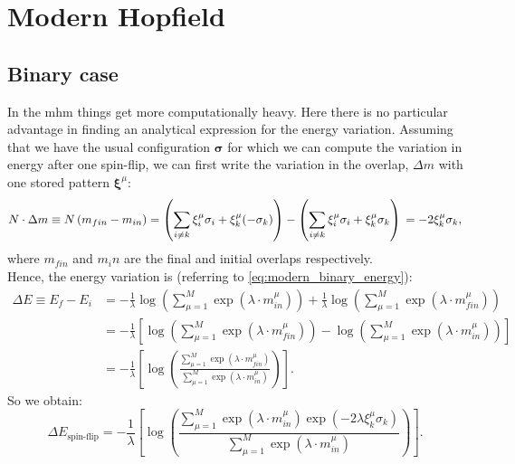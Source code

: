 \documentclass[\rootdir/main.tex]{subfiles}
\begin{document}
\section{Modern Hopfield}\label{sec:numsim_mh}
\subsection{Binary case}
In the \acrlong{mhm} things get more computationally heavy. Here there is no particular advantage in finding an analytical expression for the energy variation. Assuming that we have the usual configuration $\symbf{\sigma}$ for which we can compute the variation in energy after one spin-flip, we can first write the variation in the overlap, $\Delta m$ with one stored pattern $\symbf{\xi}^{\mu}$:
\begin{equation*}
    N \cdot \Delta m \equiv N \left( m_{fin} - m_{in} \right) = \left(\sum_{i \neq k}\xi_i^\mu \sigma_i + \xi_k^\mu (-\sigma_k)\right) - \left(\sum_{i \neq k}\xi_i^\mu \sigma_i + \xi_k^\mu \sigma_k\right)\\
= -2\xi_{k}^{\mu}\sigma_k, 
\end{equation*}
where $m_{fin}$ and $m_in$ are the final and initial overlaps respectively.\\
Hence, the energy variation is (referring to \cref{eq:modern_binary_energy}):
\begin{equation*}
\begin{split}
    \Delta E \equiv E_f - E_i & = - \frac{1}{\lambda} \log \left( \sum_{\mu = 1}^{M} \exp\left( \lambda \cdot m_{in}^\mu\right) \right)
+ \frac{1}{\lambda} \log \left( \sum_{\mu = 1}^{M} \exp\left( \lambda \cdot m_{fin}^\mu\right) \right)\\
& = - \frac{1}{\lambda} \left[\log \left(\sum_{\mu = 1}^{M} \exp\left(\lambda \cdot m_{fin}^\mu \right)\right)
- \log \left(\sum_{\mu = 1}^{M} \exp\left(\lambda \cdot m_{in}^\mu \right)\right)\right]\\
& = -\frac{1}{\lambda} \left[ \log \left( \frac{\sum_{\mu = 1}^{M} \exp\left(\lambda \cdot m_{fin}^\mu\right)}{\sum_{\mu = 1}^{M} \exp\left(\lambda \cdot m_{in}^\mu\right)} \right) \right].
\end{split}
\end{equation*}
So we obtain:
\begin{equation}\label{eq:numsim:mhm:energyvariation}
    \Delta E_{\text{spin-flip}} =  -\frac{1}{\lambda} \left[ \log \left( \frac{\sum_{\mu = 1}^{M} \exp\left(\lambda \cdot m_{in}^\mu \right)\exp\left(-2\lambda\xi_{k}^{\mu}\sigma_k \right) }{\sum_{\mu = 1}^{M} \exp\left(\lambda \cdot m_{in}^\mu\right)} \right) \right].
\end{equation}
\end{document}
